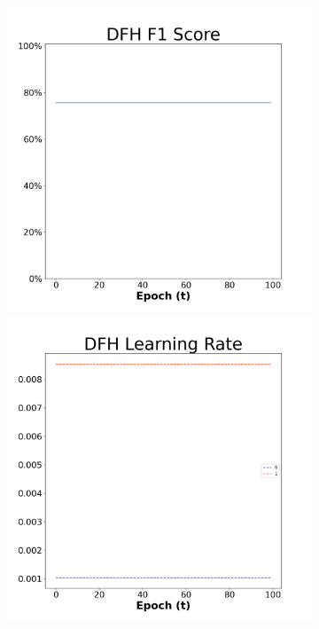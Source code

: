 \begin{figure}[H]
    \centering %
\begin{subfigure}{0.3\textwidth}
  \includegraphics[width=\linewidth]{images/exper2/NSP/DFH_0.01_f1.png}
    \includegraphics[width=\linewidth]{images/exper2/NSP/DFH_0.01_lr.png}

\end{subfigure}
\end{figure}
